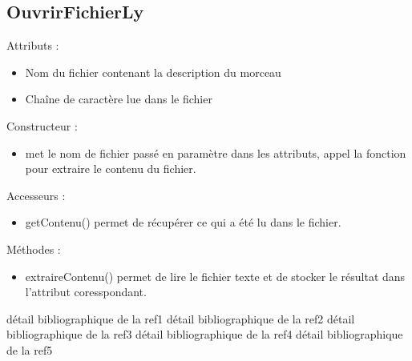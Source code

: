\documentclass{EPUProjetPeiP}
\begin{document}
\subsection{OuvrirFichierLy}

Attributs :
\begin{itemize}
\item Nom du fichier contenant la description du morceau
\item Chaîne de caractère lue dans le fichier
\end{itemize}


Constructeur : 
\begin{itemize}
\item met le nom de fichier passé en paramètre dans les attributs, appel la fonction pour extraire le contenu du fichier.
\end{itemize}


Accesseurs :
\begin{itemize}
\item getContenu() permet de récupérer ce qui a été lu dans le fichier.
\end{itemize}

Méthodes :
\begin{itemize}
\item extraireContenu() permet de lire le fichier texte et de stocker le résultat dans l'attribut coresspondant.
\end{itemize}



\begin{thebibliography}{99}
\label{sec:biblio}
  détail bibliographique de la ref1
  détail bibliographique de la ref2
  détail bibliographique de la ref3
  détail bibliographique de la ref4
  détail bibliographique de la ref5
\end{thebibliography}


\appendix
{}
\end{document}

